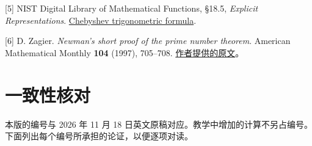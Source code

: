 \documentclass[11pt,a4paper]{article}
\begin{document}
{[}5{]} NIST Digital Library of Mathematical Functions, §18.5, \emph{Explicit Representations}. \href{https://dlmf.nist.gov/18.5.E1}{Chebyshev trigonometric formula}.

{[}6{]} D. Zagier. \emph{Newman's short proof of the prime number theorem}. American Mathematical Monthly \textbf{104} (1997), 705--708. \href{https://people.mpim-bonn.mpg.de/zagier/files/doi/10.2307/2975232/fulltext.pdf}{作者提供的原文}。

\section{一致性核对}\label{ux4e00ux81f4ux6027ux6838ux5bf9}

本版的编号与 2026 年 11 月 18 日英文原稿对应。教学中增加的计算不另占编号。下面列出每个编号所承担的论证，以便逐项对读。
\end{document}

